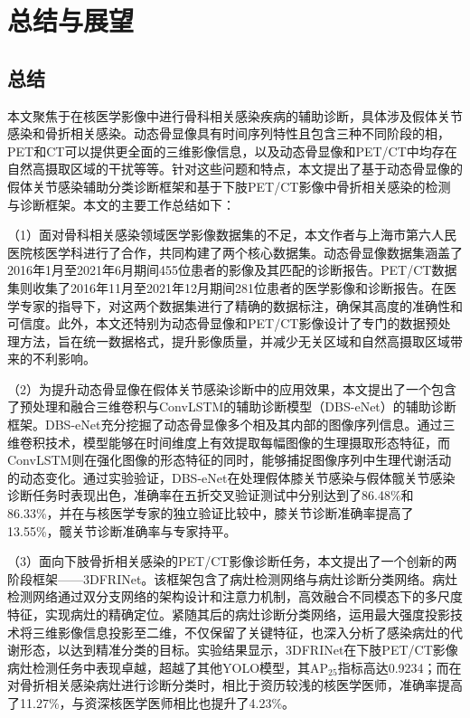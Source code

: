 \chapter{总结与展望}

\section{总结}

本文聚焦于在核医学影像中进行骨科相关感染疾病的辅助诊断，具体涉及假体关节感染和骨折相关感染。动态骨显像具有时间序列特性且包含三种不同阶段的相，PET和CT可以提供更全面的三维影像信息，以及动态骨显像和PET/CT中均存在自然高摄取区域的干扰等等。针对这些问题和特点，本文提出了基于动态骨显像的假体关节感染辅助分类诊断框架和基于下肢PET/CT影像中骨折相关感染的检测与诊断框架。本文的主要工作总结如下：

（1）面对骨科相关感染领域医学影像数据集的不足，本文作者与上海市第六人民医院核医学科进行了合作，共同构建了两个核心数据集。动态骨显像数据集涵盖了2016年1月至2021年6月期间455位患者的影像及其匹配的诊断报告。PET/CT数据集则收集了2016年11月至2021年12月期间281位患者的医学影像和诊断报告。在医学专家的指导下，对这两个数据集进行了精确的数据标注，确保其高度的准确性和可信度。此外，本文还特别为动态骨显像和PET/CT影像设计了专门的数据预处理方法，旨在统一数据格式，提升影像质量，并减少无关区域和自然高摄取区域带来的不利影响。

（2）为提升动态骨显像在假体关节感染诊断中的应用效果，本文提出了一个包含了预处理和融合三维卷积与ConvLSTM的辅助诊断模型（DBS-eNet）的辅助诊断框架。DBS-eNet充分挖掘了动态骨显像多个相及其内部的图像序列信息。通过三维卷积技术，模型能够在时间维度上有效提取每幅图像的生理摄取形态特征，而ConvLSTM则在强化图像的形态特征的同时，能够捕捉图像序列中生理代谢活动的动态变化。通过实验验证，DBS-eNet在处理假体膝关节感染与假体髋关节感染诊断任务时表现出色，准确率在五折交叉验证测试中分别达到了86.48\%和86.33\%，并在与核医学专家的独立验证比较中，膝关节诊断准确率提高了13.55\%，髋关节诊断准确率与专家持平。

（3）面向下肢骨折相关感染的PET/CT影像诊断任务，本文提出了一个创新的两阶段框架——3DFRINet。该框架包含了病灶检测网络与病灶诊断分类网络。病灶检测网络通过双分支网络的架构设计和注意力机制，高效融合不同模态下的多尺度特征，实现病灶的精确定位。紧随其后的病灶诊断分类网络，运用最大强度投影技术将三维影像信息投影至二维，不仅保留了关键特征，也深入分析了感染病灶的代谢形态，以达到精准分类的目标。实验结果显示，3DFRINet在下肢PET/CT影像病灶检测任务中表现卓越，超越了其他YOLO模型，其AP\(_{25}\)指标高达0.9234；而在对骨折相关感染病灶进行诊断分类时，相比于资历较浅的核医学医师，准确率提高了11.27\%，与资深核医学医师相比也提升了4.23\%。

